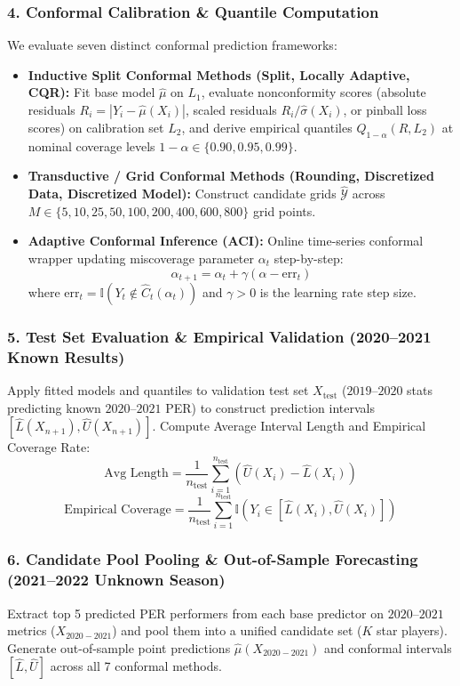 \documentclass[11pt,a4paper]{article}
\begin{document}
\subsubsection{4. Conformal Calibration \& Quantile Computation}
We evaluate seven distinct conformal prediction frameworks:
\begin{itemize}
    \item \textbf{Inductive Split Conformal Methods (Split, Locally Adaptive, CQR):} Fit base model $\hat{\mu}$ on $L_1$, evaluate nonconformity scores (absolute residuals $R_i = |Y_i - \hat{\mu}(X_i)|$, scaled residuals $R_i/\hat{\sigma}(X_i)$, or pinball loss scores) on calibration set $L_2$, and derive empirical quantiles $Q_{1-\alpha}(R, L_2)$ at nominal coverage levels $1-\alpha \in \{0.90, 0.95, 0.99\}$.
    \item \textbf{Transductive / Grid Conformal Methods (Rounding, Discretized Data, Discretized Model):} Construct candidate grids $\hat{\mathcal{Y}}$ across $M \in \{5, 10, 25, 50, 100, 200, 400, 600, 800\}$ grid points.
    \item \textbf{Adaptive Conformal Inference (ACI):} Online time-series conformal wrapper updating miscoverage parameter $\alpha_t$ step-by-step:
    \[ \alpha_{t+1} = \alpha_t + \gamma(\alpha - \text{err}_t) \]
    where $\text{err}_t = \mathbb{I}(Y_t \notin \hat{C}_t(\alpha_t))$ and $\gamma > 0$ is the learning rate step size.
\end{itemize}

\subsubsection{5. Test Set Evaluation \& Empirical Validation (2020--2021 Known Results)}
Apply fitted models and quantiles to validation test set $X_{\text{test}}$ ($2019$--$2020$ stats predicting known $2020$--$2021$ PER) to construct prediction intervals $[\hat{L}(X_{n+1}), \hat{U}(X_{n+1})]$. Compute Average Interval Length and Empirical Coverage Rate:
\[ \text{Avg Length} = \frac{1}{n_{\text{test}}} \sum_{i=1}^{n_{\text{test}}} \left( \hat{U}(X_i) - \hat{L}(X_i) \right) \]
\[ \text{Empirical Coverage} = \frac{1}{n_{\text{test}}} \sum_{i=1}^{n_{\text{test}}} \mathbb{I}\left( Y_i \in [\hat{L}(X_i), \hat{U}(X_i)] \right) \]

\subsubsection{6. Candidate Pool Pooling \& Out-of-Sample Forecasting (2021--2022 Unknown Season)}
Extract top 5 predicted PER performers from each base predictor on $2020$--$2021$ metrics ($X_{2020-2021}$) and pool them into a unified candidate set ($K$ star players). Generate out-of-sample point predictions $\hat{\mu}(X_{2020-2021})$ and conformal intervals $[\hat{L}, \hat{U}]$ across all 7 conformal methods.
\end{document}
